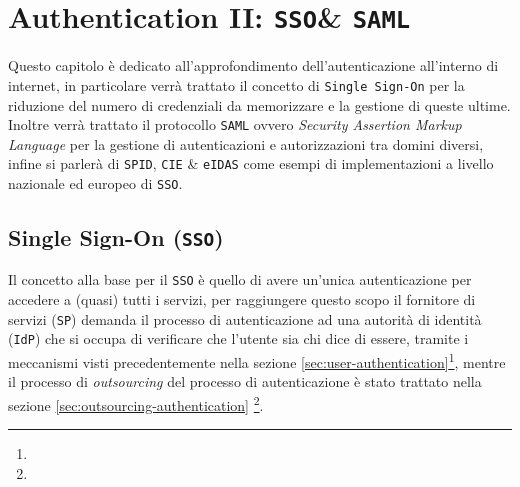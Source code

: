 \chapter{Authentication II: \texttt{SSO}\& \texttt{SAML}}
\label{chap:authentication-ii}
\thispagestyle{chapterInit}
Questo capitolo è dedicato all'approfondimento dell'autenticazione all'interno di internet, in particolare verrà trattato il concetto di \texttt{Single Sign-On} per la riduzione del numero di credenziali da memorizzare e la gestione di queste ultime. Inoltre verrà trattato il protocollo \texttt{SAML} ovvero \textit{Security Assertion Markup Language} per la gestione di autenticazioni e autorizzazioni tra domini diversi, infine si parlerà di \texttt{SPID}, \texttt{CIE} \& \texttt{eIDAS} come esempi di implementazioni a livello nazionale ed europeo di \texttt{SSO}.
\section{Single Sign-On (\texttt{SSO})}
    \label{sec:sso}
    Il concetto alla base per il \texttt{SSO} è quello di avere un'unica autenticazione per accedere a (quasi) tutti i servizi, per raggiungere questo scopo il fornitore di servizi (\texttt{SP}) demanda il processo di autenticazione ad una autorità di identità (\texttt{IdP}) che si occupa di verificare che l'utente sia chi dice di essere, tramite i meccanismi visti precedentemente nella sezione \ref{sec:user-authentication}\footnote{}, mentre il processo di \textit{outsourcing} del processo di autenticazione è stato trattato nella sezione \ref{sec:outsourcing-authentication} \footnote{}.
